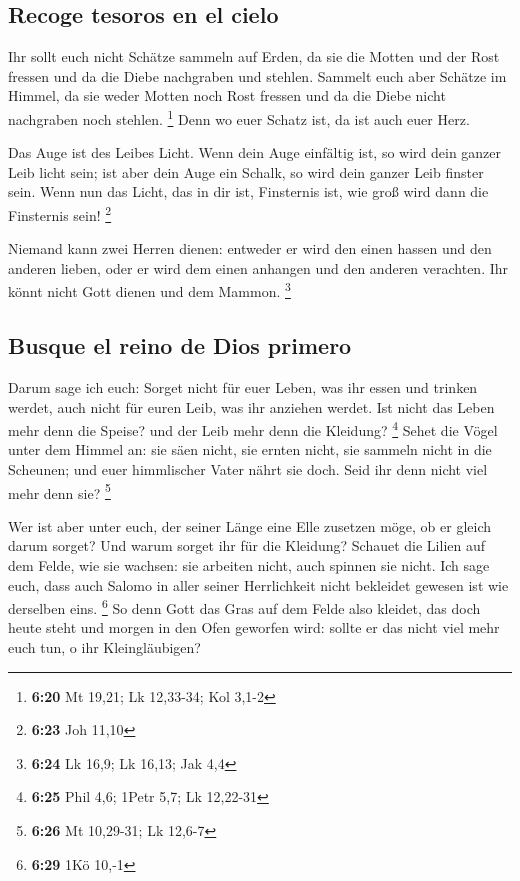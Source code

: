 \hypertarget{recoge-tesoros-en-el-cielo}{%
\subsection{Recoge tesoros en el
cielo}\label{recoge-tesoros-en-el-cielo}}

 Ihr sollt euch nicht Schätze sammeln auf Erden, da sie
die Motten und der Rost fressen und da die Diebe nachgraben und stehlen.
 Sammelt euch aber Schätze im Himmel, da sie weder Motten
noch Rost fressen und da die Diebe nicht nachgraben noch stehlen.
\footnote{\textbf{6:20} Mt 19,21; Lk 12,33-34; Kol 3,1-2}
 Denn wo euer Schatz ist, da ist auch euer Herz.

 Das Auge ist des Leibes Licht. Wenn dein Auge einfältig
ist, so wird dein ganzer Leib licht sein;  ist aber dein
Auge ein Schalk, so wird dein ganzer Leib finster sein. Wenn nun das
Licht, das in dir ist, Finsternis ist, wie groß wird dann die Finsternis
sein! \footnote{\textbf{6:23} Joh 11,10}

 Niemand kann zwei Herren dienen: entweder er wird den
einen hassen und den anderen lieben, oder er wird dem einen anhangen und
den anderen verachten. Ihr könnt nicht Gott dienen und dem Mammon.
\footnote{\textbf{6:24} Lk 16,9; Lk 16,13; Jak 4,4}

\hypertarget{busque-el-reino-de-dios-primero}{%
\subsection{Busque el reino de Dios
primero}\label{busque-el-reino-de-dios-primero}}

 Darum sage ich euch: Sorget nicht für euer Leben, was
ihr essen und trinken werdet, auch nicht für euren Leib, was ihr
anziehen werdet. Ist nicht das Leben mehr denn die Speise? und der Leib
mehr denn die Kleidung? \footnote{\textbf{6:25} Phil 4,6; 1Petr 5,7; Lk
  12,22-31}  Sehet die Vögel unter dem Himmel an: sie
säen nicht, sie ernten nicht, sie sammeln nicht in die Scheunen; und
euer himmlischer Vater nährt sie doch. Seid ihr denn nicht viel mehr
denn sie? \footnote{\textbf{6:26} Mt 10,29-31; Lk 12,6-7}

 Wer ist aber unter euch, der seiner Länge eine Elle
zusetzen möge, ob er gleich darum sorget?  Und warum
sorget ihr für die Kleidung? Schauet die Lilien auf dem Felde, wie sie
wachsen: sie arbeiten nicht, auch spinnen sie nicht.  Ich
sage euch, dass auch Salomo in aller seiner Herrlichkeit nicht bekleidet
gewesen ist wie derselben eins. \footnote{\textbf{6:29} 1Kö 10,-1}
 So denn Gott das Gras auf dem Felde also kleidet, das
doch heute steht und morgen in den Ofen geworfen wird: sollte er das
nicht viel mehr euch tun, o ihr Kleingläubigen?

